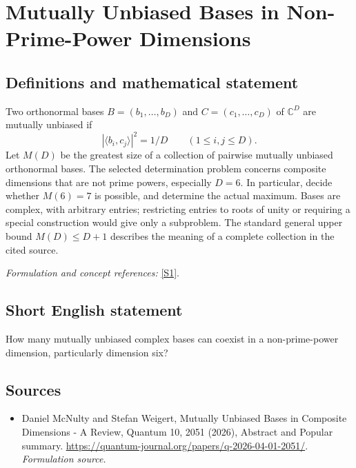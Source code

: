 \documentclass[11pt]{article}
\begin{document}
\section*{\texorpdfstring{Mutually Unbiased Bases in Non-Prime-Power Dimensions}{Mutually Unbiased Bases in Non-Prime-Power Dimensions}}\label{30004862}
\subsection{Definitions and mathematical statement}
Two orthonormal bases $B=(b_1,\ldots,b_D)$ and $C=(c_1,\ldots,c_D)$ of ${\mathbb{C}}^D$ are mutually unbiased if
\[
 |\langle b_i,c_j\rangle|^2=1/D\qquad(1\le i,j\le D).
\]
Let $M(D)$ be the greatest size of a collection of pairwise mutually unbiased orthonormal bases. The selected determination problem concerns composite dimensions that are not prime powers, especially $D=6$. In particular, decide whether $M(6)=7$ is possible, and determine the actual maximum. Bases are complex, with arbitrary entries; restricting entries to roots of unity or requiring a special construction would give only a subproblem. The standard general upper bound $M(D)\le D+1$ describes the meaning of a complete collection in the cited source.
\par\smallskip\textit{Formulation and concept references:} \href{https://quantum-journal.org/papers/q-2026-04-01-2051/}{[S1]}.

\subsection{Short English statement}
How many mutually unbiased complex bases can coexist in a non-prime-power dimension, particularly dimension six?
\subsection{Sources}
\begin{itemize}
\item[S1]Daniel McNulty and Stefan Weigert, Mutually Unbiased Bases in Composite Dimensions - A Review, Quantum 10, 2051 (2026), Abstract and Popular summary.
\url{https://quantum-journal.org/papers/q-2026-04-01-2051/}.
\textit{Formulation source.}
\end{itemize}
\end{document}
